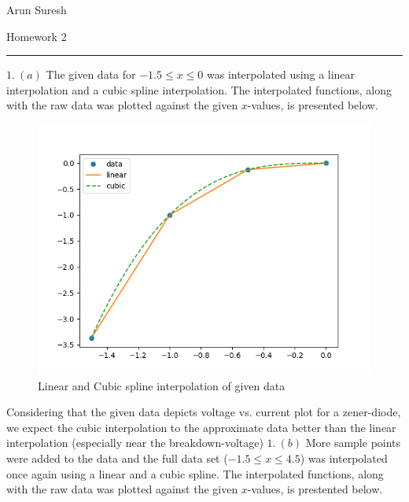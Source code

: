 \documentclass[12pt]{article}
\begin{document}
	\quad \quad \quad \quad \quad \quad \quad \quad \quad \quad  \quad \quad \quad \quad \quad \quad \quad \quad \quad \quad  \quad \quad \quad \quad \quad \quad \quad \quad \quad \quad  Arun Suresh
	\begin{center}
		Homework 2
	\end{center} 
	{\rule{\linewidth}{0.1mm} }
	
\indent $1. \ (a)$ The given data for $-1.5 \leq x \leq 0$ was interpolated using a linear interpolation and a cubic spline interpolation. The interpolated functions, along with the raw data was plotted against the given $x$-values, is presented below.\\
\begin{figure}[h]
	\centering
	\includegraphics[scale=0.75]{1a.png}
	\caption{Linear and Cubic spline interpolation of given data}
\end{figure}
Considering that the given data depicts voltage vs. current plot for a zener-diode, we expect the cubic interpolation to the approximate data better than the linear interpolation (especially near the breakdown-voltage)
\newpage
\indent $1. \ (b)$ More sample points were added to the data and the full data set ($-1.5 \leq x \leq 4.5$) was interpolated once again using a linear and a cubic spline. The interpolated functions, along with the raw data was plotted against the given $x$-values, is prestented below.\\\\
\end{document}
